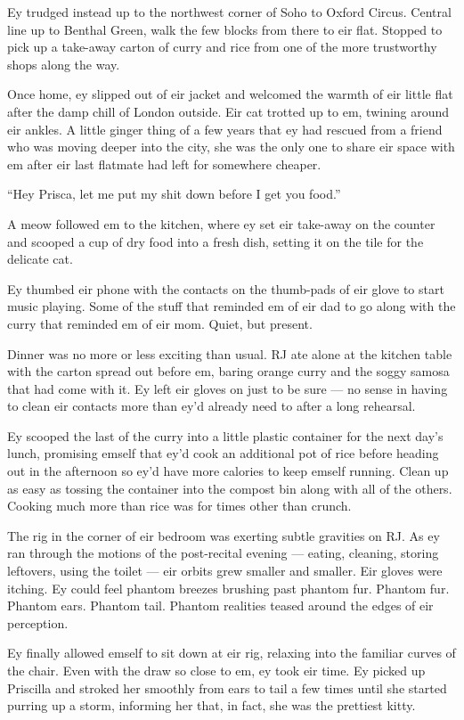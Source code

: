 Ey trudged instead up to the northwest corner of Soho to Oxford Circus. Central line up to Benthal Green, walk the few blocks from there to eir flat. Stopped to pick up a take-away carton of curry and rice from one of the more trustworthy shops along the way.

Once home, ey slipped out of eir jacket and welcomed the warmth of eir little flat after the damp chill of London outside. Eir cat trotted up to em, twining around eir ankles. A little ginger thing of a few years that ey had rescued from a friend who was moving deeper into the city, she was the only one to share eir space with em after eir last flatmate had left for somewhere cheaper.

``Hey Prisca, let me put my shit down before I get you food.''

A meow followed em to the kitchen, where ey set eir take-away on the counter and scooped a cup of dry food into a fresh dish, setting it on the tile for the delicate cat.

Ey thumbed eir phone with the contacts on the thumb-pads of eir glove to start music playing. Some of the stuff that reminded em of eir dad to go along with the curry that reminded em of eir mom. Quiet, but present.

Dinner was no more or less exciting than usual. RJ ate alone at the kitchen table with the carton spread out before em, baring orange curry and the soggy samosa that had come with it. Ey left eir gloves on just to be sure — no sense in having to clean eir contacts more than ey'd already need to after a long rehearsal.

Ey scooped the last of the curry into a little plastic container for the next day's lunch, promising emself that ey'd cook an additional pot of rice before heading out in the afternoon so ey'd have more calories to keep emself running. Clean up as easy as tossing the container into the compost bin along with all of the others. Cooking much more than rice was for times other than crunch.

The rig in the corner of eir bedroom was exerting subtle gravities on RJ. As ey ran through the motions of the post-recital evening — eating, cleaning, storing leftovers, using the toilet — eir orbits grew smaller and smaller. Eir gloves were itching. Ey could feel phantom breezes brushing past phantom fur. Phantom fur. Phantom ears. Phantom tail. Phantom realities teased around the edges of eir perception.

Ey finally allowed emself to sit down at eir rig, relaxing into the familiar curves of the chair. Even with the draw so close to em, ey took eir time. Ey picked up Priscilla and stroked her smoothly from ears to tail a few times until she started purring up a storm, informing her that, in fact, she was the prettiest kitty.

